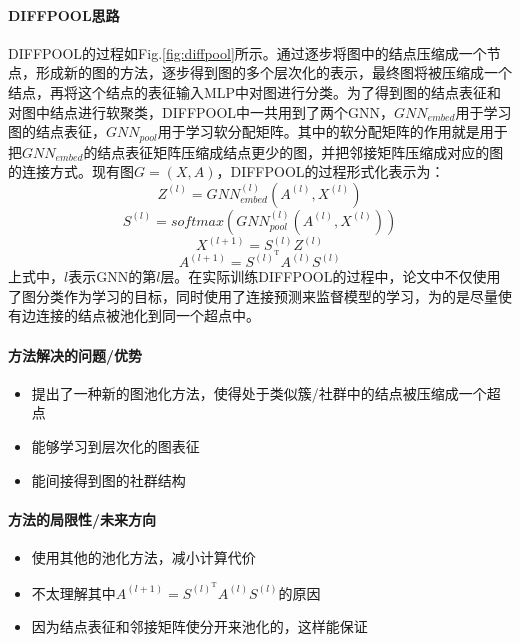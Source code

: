 \paragraph{DIFFPOOL思路}DIFFPOOL的过程如Fig.\ref{fig:diffpool}所示。通过逐步将图中的结点压缩成一个节点，形成新的图的方法，逐步得到图的多个层次化的表示，最终图将被压缩成一个结点，再将这个结点的表征输入MLP中对图进行分类。为了得到图的结点表征和对图中结点进行软聚类，DIFFPOOL中一共用到了两个GNN，$GNN_{embed}$用于学习图的结点表征，$GNN_{pool}$用于学习软分配矩阵。其中的软分配矩阵的作用就是用于把$GNN_{embed}$的结点表征矩阵压缩成结点更少的图，并把邻接矩阵压缩成对应的图的连接方式。现有图$G = (X, A)$，DIFFPOOL的过程形式化表示为：
$$
Z^{(l)} = GNN^{(l)}_{embed}(A^{(l)}, X^{(l)} )
$$
$$
S^{(l)} = softmax( GNN^{(l)}_{pool}(A^{(l)}, X^{(l)} ) )
$$
$$
X^{(l+1)} = S^{(l)}Z^{(l)}
$$
$$
A^{(l+1)} = S^{(l)^\mathrm{T}} A^{(l)} S^{(l)}
$$
上式中，$l$表示GNN的第$l$层。在实际训练DIFFPOOL的过程中，论文中不仅使用了图分类作为学习的目标，同时使用了连接预测来监督模型的学习，为的是尽量使有边连接的结点被池化到同一个超点中。


\paragraph{方法解决的问题/优势}
\begin{itemize}
	\item 提出了一种新的图池化方法，使得处于类似簇/社群中的结点被压缩成一个超点
	\item 能够学习到层次化的图表征
	\item 能间接得到图的社群结构

\end{itemize}

\paragraph{方法的局限性/未来方向}
\begin{itemize}
	\item 使用其他的池化方法，减小计算代价
	\item 不太理解其中$A^{(l+1)} = S^{(l)^\mathrm{T}} A^{(l)} S^{(l)}$的原因
	\item 因为结点表征和邻接矩阵使分开来池化的，这样能保证

\end{itemize}


